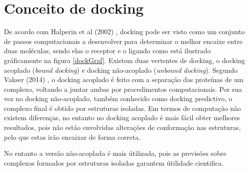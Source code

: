 \section{Conceito de docking}
De acordo com Halperin et al (2002) \cite{halperin}, docking pode ser visto como um conjunto de passos computacionais a desenvolver para determinar o melhor encaixe entre duas moléculas, sendo elas o receptor e o ligando como está ilustrado gráficamente na figura \ref{dockGraf}. 
%
Existem duas vertentes de docking, o docking acoplado (\textit{bound docking}) e docking não-acoplado (\textit{unbound docking}). Segundo Vakser (2014) \cite{vakser2014protein}, o docking acoplado é feito com a separação das proteínas de um complexo, voltando a juntar ambas por procedimentos computacionais. Por sua vez no docking não-acoplado, também conhecido como docking predictivo, o complexo final é obtido por estruturas isoladas. Em termos de computação não existem diferenças, no entanto no docking acoplado é mais fácil obter melhores resultados, pois não estão envolvidas alterações de conformação nas estruturas, pelo que estas irão encaixar de forma correta.  \par No entanto a versão não-acoplada é mais útilizada, pois as previsões sobre complexos formados por estruturas isoladas garantem útilidade cientifica.
